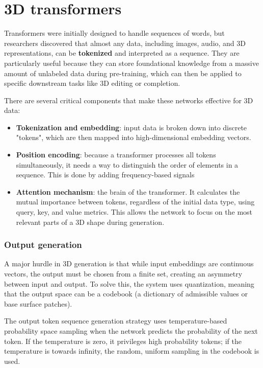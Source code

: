 \section{3D transformers}
Transformers were initially designed to handle sequences of words, but researchers discovered that almost any data, including images, audio, and 3D representations, can be \textbf{tokenized} and interpreted as a sequence. They are particularly useful because they can store foundational knowledge from a massive amount of unlabeled data during pre-training, which can then be applied to specific downstream tasks like 3D editing or completion. \par
There are several critical components that make these networks effective for 3D data:
\begin{itemize}[noitemsep]
    \item \textbf{Tokenization and embedding}: input data is broken down into discrete "tokens", which are then mapped into high-dimensional embedding vectors.
    \item \textbf{Position encoding}: because a transformer processes all tokens simultaneously, it needs a way to distinguish the order of elements in a sequence. This is done by adding frequency-based signals
    \item \textbf{Attention mechanism}: the brain of the transformer. It calculates the mutual importance between tokens, regardless of the initial data type, using query, key, and value metrics. This allows the network to focus on the most relevant parts of a 3D shape during generation.
\end{itemize}

\subsubsection{Output generation}
A major hurdle in 3D generation is that while input embeddings are continuous vectors, the output must be chosen from a finite set, creating an asymmetry between input and output. To solve this, the system uses quantization, meaning that the output space can be a codebook (a dictionary of admissible values or base surface patches). \par
The output token sequence generation strategy uses temperature-based probability space sampling when the network predicts the probability of the next token. If the temperature is zero, it privileges high probability tokens; if the temperature is towards infinity, the random, uniform sampling in the codebook is used.

